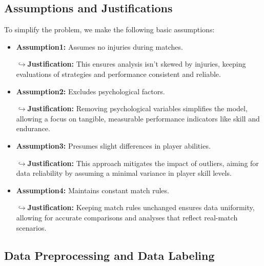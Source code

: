 \documentclass[12pt]{article}%
\begin{document}
	\subsection{Assumptions and Justifications}
	To simplify the problem, we make the following basic assumptions: \\
	\begin{itemize}
		\setlength{\parsep}{0ex} %
		\setlength{\topsep}{2ex} %
		\setlength{\itemsep}{1ex} %
		\item \textbf{Assumption1:} Assumes no injuries during matches.
		
		\textbf{$\hookrightarrow$Justification:} This ensures analysis isn't skewed by injuries, keeping evaluations of strategies and performance consistent and reliable.
		
		\item \textbf{Assumption2:} Excludes psychological factors.
		
		\textbf{$\hookrightarrow$Justification:} Removing psychological variables simplifies the model, allowing a focus on tangible, measurable performance indicators like skill and endurance.
		
		\item \textbf{Assumption3:} Presumes slight differences in player abilities.
		
		\textbf{$\hookrightarrow$Justification:} This approach mitigates the impact of outliers, aiming for data reliability by assuming a minimal variance in player skill levels.
		
		\item \textbf{Assumption4:} Maintains constant match rules. 
		
		\textbf{$\hookrightarrow$Justification:} Keeping match rules unchanged ensures data uniformity, allowing for accurate comparisons and analyses that reflect real-match scenarios.
	\end{itemize}
	
	
	
	
	\subsection{Data Preprocessing and Data Labeling}
\end{document}
